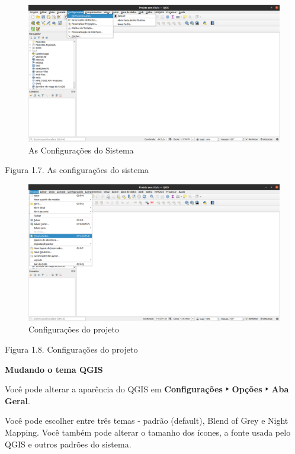 \documentclass[
]{book}
\begin{document}
\begin{figure}
\centering
\includegraphics{media/modulo1/settings-1.png}
\caption{As Configurações do Sistema}
\end{figure}

Figura 1.7. As configurações do sistema

\begin{figure}
\centering
\includegraphics{media/modulo1/settings-2.png}
\caption{Configurações do projeto}
\end{figure}

Figura 1.8. Configurações do projeto

\textbf{Mudando o tema QGIS}

Você pode alterar a aparência do QGIS em \textbf{Configurações ‣ Opções ‣ Aba Geral}.

Você pode escolher entre três temas - padrão (default), Blend of Grey e Night Mapping. Você também pode alterar o tamanho dos ícones, a fonte usada pelo QGIS e outros padrões do sistema.
\end{document}
